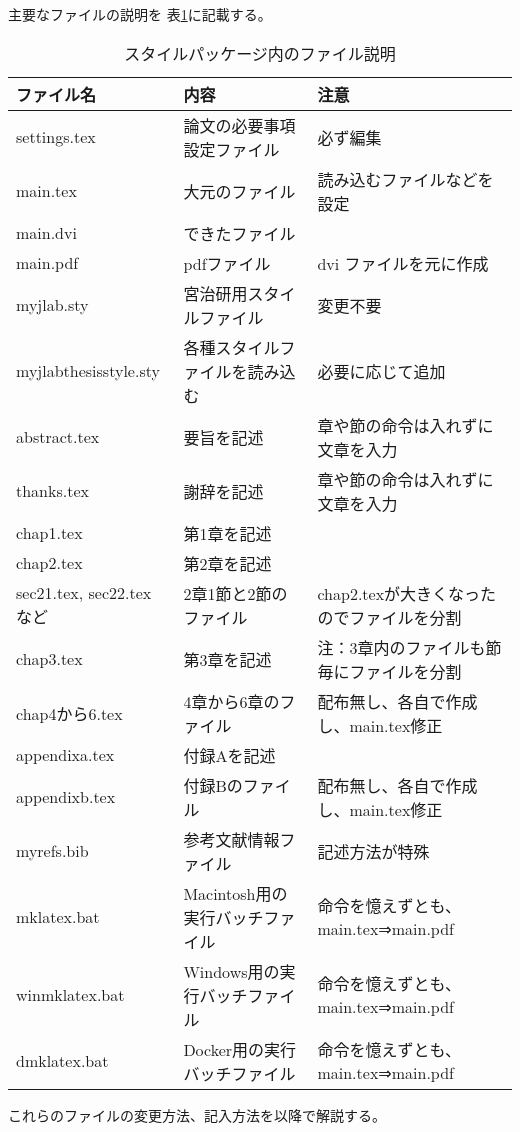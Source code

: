 主要なファイルの説明を 表\ref{table:files2}に記載する。
\begin{table}[H]
\centering
\caption{スタイルパッケージ内のファイル説明}
\vspace{-2mm}
{\footnotesize
\begin{tabular}{|l|l|l|}
\hline
ファイル名 & 内容 & 注意\\\hline\hline
settings.tex & 論文の必要事項設定ファイル & 必ず編集\\\hline
main.tex & 大元のファイル & 読み込むファイルなどを設定\\\hline
main.dvi & できたファイル & \\\hline
main.pdf & pdfファイル & dvi ファイルを元に作成\\\hline
myjlab.sty & 宮治研用スタイルファイル & 変更不要\\\hline
myjlabthesisstyle.sty & 各種スタイルファイルを読み込む & 必要に応じて追加\\\hline
abstract.tex & 要旨を記述 & 章や節の命令は入れずに文章を入力\\\hline
thanks.tex & 謝辞を記述 & 章や節の命令は入れずに文章を入力\\\hline
chap1.tex & 第1章を記述 & \\\hline
chap2.tex & 第2章を記述 & \\\hline
sec21.tex, sec22.tex など& 2章1節と2節のファイル & chap2.texが大きくなったのでファイルを分割\\\hline
chap3.tex & 第3章を記述 & 注：3章内のファイルも節毎にファイルを分割\\\hline
chap4から6.tex & 4章から6章のファイル & 配布無し、各自で作成し、main.tex修正\\\hline
appendixa.tex & 付録Aを記述 & \\\hline
appendixb.tex & 付録Bのファイル & 配布無し、各自で作成し、main.tex修正\\\hline
myrefs.bib & 参考文献情報ファイル & 記述方法が特殊\\\hline
mklatex.bat & Macintosh用の実行バッチファイル & 命令を憶えずとも、main.tex⇒main.pdf\\\hline
winmklatex.bat & Windows用の実行バッチファイル & 命令を憶えずとも、
main.tex⇒main.pdf\\\hline
dmklatex.bat & Docker用の実行バッチファイル & 命令を憶えずとも、
main.tex⇒main.pdf\\\hline
\end{tabular}
}
\label{table:files2}
\end{table}

これらのファイルの変更方法、記入方法を以降で解説する。